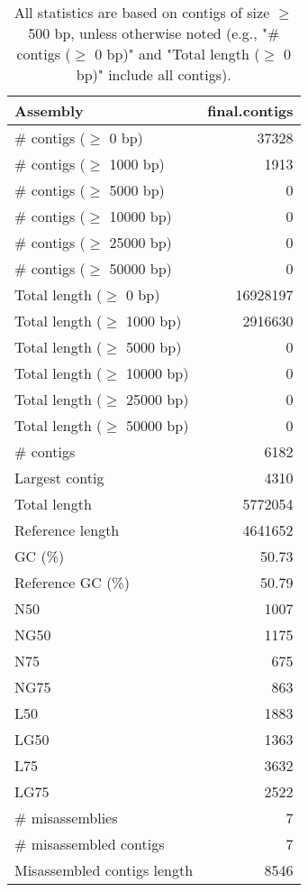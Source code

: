 \documentclass[12pt,a4paper]{article}
\begin{document}
\begin{table}[ht]
\begin{center}
\caption{All statistics are based on contigs of size $\geq$ 500 bp, unless otherwise noted (e.g., "\# contigs ($\geq$ 0 bp)" and "Total length ($\geq$ 0 bp)" include all contigs).}
\begin{tabular}{|l*{1}{|r}|}
\hline
Assembly & final.contigs \\ \hline
\# contigs ($\geq$ 0 bp) & 37328 \\ \hline
\# contigs ($\geq$ 1000 bp) & 1913 \\ \hline
\# contigs ($\geq$ 5000 bp) & 0 \\ \hline
\# contigs ($\geq$ 10000 bp) & 0 \\ \hline
\# contigs ($\geq$ 25000 bp) & 0 \\ \hline
\# contigs ($\geq$ 50000 bp) & 0 \\ \hline
Total length ($\geq$ 0 bp) & 16928197 \\ \hline
Total length ($\geq$ 1000 bp) & 2916630 \\ \hline
Total length ($\geq$ 5000 bp) & 0 \\ \hline
Total length ($\geq$ 10000 bp) & 0 \\ \hline
Total length ($\geq$ 25000 bp) & 0 \\ \hline
Total length ($\geq$ 50000 bp) & 0 \\ \hline
\# contigs & 6182 \\ \hline
Largest contig & 4310 \\ \hline
Total length & 5772054 \\ \hline
Reference length & 4641652 \\ \hline
GC (\%) & 50.73 \\ \hline
Reference GC (\%) & 50.79 \\ \hline
N50 & 1007 \\ \hline
NG50 & 1175 \\ \hline
N75 & 675 \\ \hline
NG75 & 863 \\ \hline
L50 & 1883 \\ \hline
LG50 & 1363 \\ \hline
L75 & 3632 \\ \hline
LG75 & 2522 \\ \hline
\# misassemblies & 7 \\ \hline
\# misassembled contigs & 7 \\ \hline
Misassembled contigs length & 8546 \\ \hline

\end{tabular}
\end{center}
\end{table}
\end{document}
